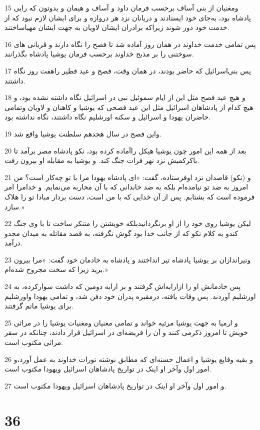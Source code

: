 \par 15 ومغنیان از بنی آساف برحسب فرمان داود و آساف و هیمان و یدوتون که رایی پادشاه بود، به‌جای خود ایستادند و دربانان نزد هر دروازه و برای ایشان لازم نبود که از خدمت خود دور شوند زیراکه برادران ایشان لاویان به جهت ایشان مهیاساختند.
\par 16 پس تمامی خدمت خداوند در همان روز آماده شد تا فصح را نگاه دارند و قربانی های سوختنی را بر مذبح خداوند برحسب فرمان یوشیا پادشاه بگذرانند.
\par 17 پس بنی‌اسرائیل که حاضر بودند، در همان وقت، فصح و عید فطیر راهفت روز نگاه داشتند.
\par 18 و هیچ عید فصح مثل این از ایام سموئیل نبی در اسرائیل نگاه داشته نشده بود، و هیچ کدام از پادشاهان اسرائیل مثل این عید فصحی که یوشیا و کاهنان و لاویان وتمامی حاضران یهودا و اسرائیل و سکنه اورشلیم نگاه داشتند، نگاه نداشته بود.
\par 19 واین فصح در سال هجدهم سلطنت یوشیا واقع شد.
\par 20 بعد از همه این امور چون یوشیا هیکل راآماده کرده بود، نکو پادشاه مصر برآمد تا باکرکمیش نزد نهر فرات جنگ کند. و یوشیا به مقابله او بیرون رفت.
\par 21 و (نکو) قاصدان نزد اوفرستاده، گفت: «ای پادشاه یهودا مرا با تو چه‌کار است؟ من امروز به ضد تو نیامده‌ام بلکه به ضد خاندانی که با آن محاربه می‌نمایم. و خدامرا امر فرموده است که بشتابم. پس از آن خدایی که با من است، دست بردار مبادا تو را هلاک سازد.»
\par 22 لیکن یوشیا روی خود را از او برنگردانیدبلکه خویشتن را متنکر ساخت تا با وی جنگ کندو به کلام نکو که از جانب خدا بود گوش نگرفته، به قصد مقاتله به میدان مجدو درآمد.
\par 23 وتیراندازان بر یوشیا پادشاه تیر انداختند و پادشاه به خادمان خود گفت: «مرا بیرون برید زیرا که سخت مجروح شده‌ام.»
\par 24 پس خادمانش او را ازارابه‌اش گرفتند و بر ارابه دومین که داشت سوارکرده، به اورشلیم آوردند. پس وفات یافته، درمقبره پدران خود دفن شد، و تمامی یهودا واورشلیم برای یوشیا ماتم گرفتند.
\par 25 و ارمیا به جهت یوشیا مرثیه خواند و تمامی مغنیان ومغنیات یوشیا را در مراثی خویش تا امروز ذکرمی کنند و آن را فریضه‌ای در اسرائیل قرار دادند، چنانکه در سفر مراثی مکتوب است.
\par 26 و بقیه وقایع یوشیا و اعمال حسنه‌ای که مطابق نوشته تورات خداوند به عمل آورد،و امور اول وآخر او اینک در تواریخ پادشاهان اسرائیل ویهودا مکتوب است.
\par 27 و امور اول وآخر او اینک در تواریخ پادشاهان اسرائیل ویهودا مکتوب است.
 
\chapter{36}

